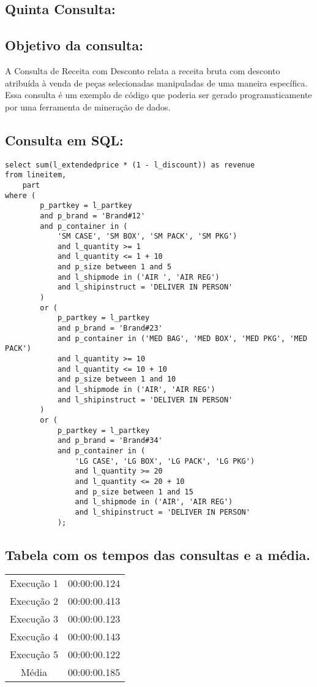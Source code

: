 \documentclass[12pt]{article}
\begin{document}
\begin{landscape}
\section{Quinta Consulta:}


\subsection{Objetivo da consulta:}
A Consulta de Receita com Desconto relata a receita bruta com desconto atribuída à venda de peças selecionadas manipuladas de uma maneira específica. Essa consulta é um exemplo de código que poderia ser gerado programaticamente por uma ferramenta de mineração de dados.

\subsection{Consulta em SQL:}
\begin{lstlisting}
select sum(l_extendedprice * (1 - l_discount)) as revenue
from lineitem,
	part
where (
		p_partkey = l_partkey
		and p_brand = 'Brand#12'
		and p_container in (
			'SM CASE', 'SM BOX', 'SM PACK', 'SM PKG')
			and l_quantity >= 1
			and l_quantity <= 1 + 10
			and p_size between 1 and 5
			and l_shipmode in ('AIR ', 'AIR REG')
			and l_shipinstruct = 'DELIVER IN PERSON'
		)
		or (
			p_partkey = l_partkey
			and p_brand = 'Brand#23'
			and p_container in ('MED BAG', 'MED BOX', 'MED PKG', 'MED PACK')
			and l_quantity >= 10
			and l_quantity <= 10 + 10
			and p_size between 1 and 10
			and l_shipmode in ('AIR', 'AIR REG')
			and l_shipinstruct = 'DELIVER IN PERSON'
		)
		or (
			p_partkey = l_partkey
			and p_brand = 'Brand#34'
			and p_container in (
				'LG CASE', 'LG BOX', 'LG PACK', 'LG PKG')
				and l_quantity >= 20
				and l_quantity <= 20 + 10
				and p_size between 1 and 15
				and l_shipmode in ('AIR', 'AIR REG')
				and l_shipinstruct = 'DELIVER IN PERSON'
			);
\end{lstlisting}

\subsection{Tabela com os tempos das consultas e a média.}
\begin{tabular}{|c|c|}
  \hline
  Execução 1 & 00:00:00.124 \\
  Execução 2 & 00:00:00.413 \\
  Execução 3 & 00:00:00.123 \\
  Execução 4 & 00:00:00.143 \\
  Execução 5 & 00:00:00.122 \\
  \hline
  Média & 00:00:00.185 \\
  \hline
\end{tabular}


\end{landscape}
\end{document}
